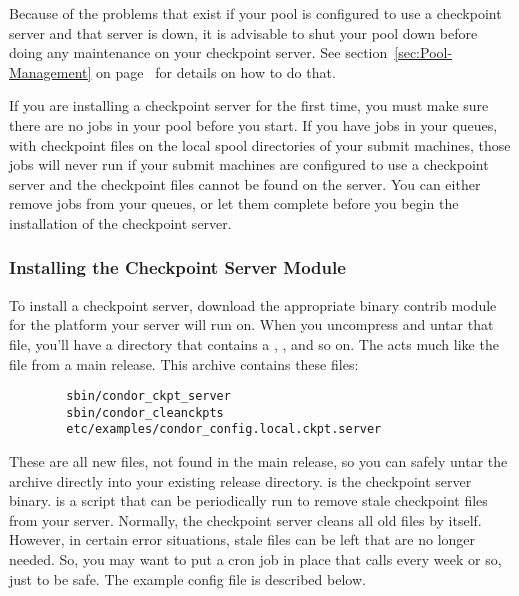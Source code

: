 Because of the problems that exist if your pool is configured to use a
checkpoint server and that server is down, it is advisable to shut
your pool down before doing any maintenance on your checkpoint
server.  
See section~\ref{sec:Pool-Management} on
page~\pageref{sec:Pool-Management} for details on how to do that. 

If you are installing a checkpoint server for the first time,
you must make sure there are no jobs in your pool before you start.
If you have jobs in your queues, with checkpoint files on the local
spool directories of your submit machines, those jobs will never run
if your submit machines are configured to use a checkpoint server and
the checkpoint files cannot be found on the server.  
You can either remove jobs from your queues, or let them complete
before you begin the installation of the checkpoint server.

\subsubsection{\label{sec:Install-Ckpt-Server-Module}
Installing the Checkpoint Server Module} 

To install a checkpoint server, download the appropriate binary
contrib module for the platform your server will run on.
When you uncompress and untar that file, you'll have a directory that
contains a , , and so on.
The  acts much like the  file
from a main release.
This archive contains these files:
\begin{verbatim}
        sbin/condor_ckpt_server
        sbin/condor_cleanckpts
        etc/examples/condor_config.local.ckpt.server
\end{verbatim}
These are all new files, not found in the main release, so you can
safely untar the archive directly into your existing release
directory. 
 is the checkpoint server binary.
 is a script that can be periodically run to
remove stale checkpoint files from your server.  
Normally, the checkpoint server cleans all old files by itself.  
However, in certain error situations, stale files can be left that are
no longer needed. 
So, you may want to put a cron job in place that calls
 every week or so, just to be safe.
The example config file is described below.

